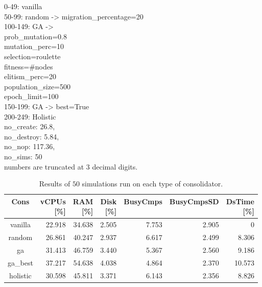 0-49: vanilla\\
50-99: random -> migration\_percentage=20\\
100-149: GA ->\\
    prob\_mutation=0.8\\
    mutation\_perc=10\\
    selection=roulette\\
    fitness=\#nodes\\
    elitism\_perc=20\\
    population\_size=500\\
    epoch\_limit=100\\
150-199: GA -> best=True\\
200-249: Holistic\\

no\_create: 26.8,\\
no\_destroy: 5.84,\\
no\_nop: 117.36,\\
no\_sims: 50\\

numbers are truncated at 3 decimal digits.

\begin{table}[H]
\centering
  \begin{tabular}{| c | r | r | r | r | r | r |}
  \hline
  \textbf{Cons} & 
  \allownewline[t]{\textbf{vCPUs}\\[0pt]\textbf{[\%]}} & 
  \allownewline[t]{\textbf{RAM}\\[0pt]\textbf{[\%]}} & 
  \allownewline[t]{\textbf{Disk}\\[0pt]\textbf{[\%]}} & 
  \textbf{BusyCmps} & 
  \textbf{BusyCmpsSD} & 
  \allownewline[t]{\textbf{DsTime}\\[0pt]\textbf{[\%]}} \\
  \hline
  vanilla & 22.918 & 34.638 & 2.505 & 7.753 & 2.905 & 0 \\
  \hline
  random & 26.861 & 40.247 & 2.937 & 6.617 & 2.499 & 8.306 \\
  \hline
  ga & 31.413 & 46.759 & 3.440 & 5.367 & 2.560 & 9.186 \\
  \hline
  ga\_best & 37.217 & 54.638 & 4.038 & 4.864 & 2.370 & 10.573 \\
  \hline
  holistic & 30.598 & 45.811 & 3.371 & 6.143 & 2.356 & 8.826 \\
  \hline
  \end{tabular}
  \vspace{2mm}
  \caption{Results of $50$ simulations run on each type of consolidator.}
  \label{tab:cons_vs}
\end{table}
